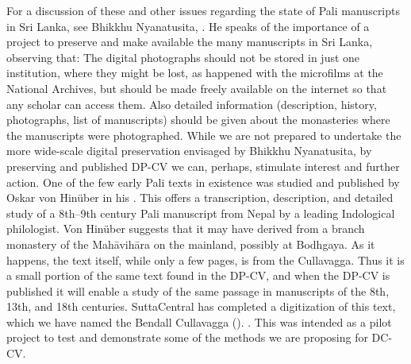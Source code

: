 {}For a discussion of these and other issues regarding the state of Pali manuscripts in Sri Lanka, see Bhikkhu Nyanatusita, . He speaks of the importance of a project to preserve and make available the many manuscripts in Sri Lanka, observing that:\markdownRendererInterblockSeparator
{}\markdownRendererBlockQuoteBegin
The digital photographs should not be stored in just one institution, where they might be lost, as happened with the microfilms at the National Archives, but should be made freely available on the internet so that any scholar can access them. Also detailed information (description, history, photographs, list of manuscripts) should be given about the monasteries where the manuscripts were photographed.
\markdownRendererBlockQuoteEnd \markdownRendererInterblockSeparator
{}While we are not prepared to undertake the more wide-scale digital preservation envisaged by Bhikkhu Nyanatusita, by preserving and published DP-CV we can, perhaps, stimulate interest and further action.\markdownRendererInterblockSeparator
{}One of the few early Pali texts in existence was studied and published by Oskar von Hinüber in his . This offers a transcription, description, and detailed study of a 8th–9th century Pali manuscript from Nepal by a leading Indological philologist. Von Hinüber suggests that it may have derived from a branch monastery of the Mahāvihāra on the mainland, possibly at Bodhgaya.\markdownRendererInterblockSeparator
{}As it happens, the text itself, while only a few pages, is from the Culla­vagga. Thus it is a small portion of the same text found in the DP-CV, and when the DP-CV is published it will enable a study of the same passage in manuscripts of the 8th, 13th, and 18th centuries. SuttaCentral has completed a digitization of this text, which we have named the Bendall Culla­vagga (). . This was intended as a pilot project to test and demonstrate some of the methods we are proposing for DC-CV.\markdownRendererInterblockSeparator
